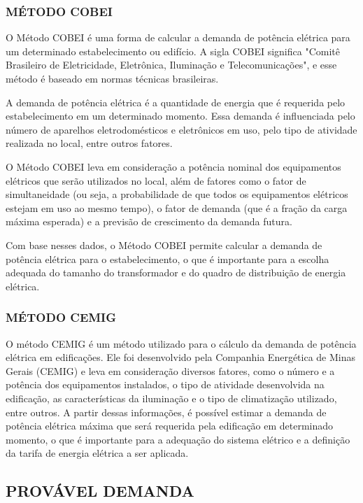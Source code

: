 \subsubsection{MÉTODO COBEI}
O Método COBEI é uma forma de calcular a demanda de potência elétrica para um determinado estabelecimento ou edifício. A sigla COBEI significa "Comitê Brasileiro de Eletricidade, Eletrônica, Iluminação e Telecomunicações", e esse método é baseado em normas técnicas brasileiras.

A demanda de potência elétrica é a quantidade de energia que é requerida pelo estabelecimento em um determinado momento. Essa demanda é influenciada pelo número de aparelhos eletrodomésticos e eletrônicos em uso, pelo tipo de atividade realizada no local, entre outros fatores.

O Método COBEI leva em consideração a potência nominal dos equipamentos elétricos que serão utilizados no local, além de fatores como o fator de simultaneidade (ou seja, a probabilidade de que todos os equipamentos elétricos estejam em uso ao mesmo tempo), o fator de demanda (que é a fração da carga máxima esperada) e a previsão de crescimento da demanda futura.

Com base nesses dados, o Método COBEI permite calcular a demanda de potência elétrica para o estabelecimento, o que é importante para a escolha adequada do tamanho do transformador e do quadro de distribuição de energia elétrica.

\subsubsection{MÉTODO CEMIG}

O método CEMIG é um método utilizado para o cálculo da demanda de potência elétrica em edificações. Ele foi desenvolvido pela Companhia Energética de Minas Gerais (CEMIG) e leva em consideração diversos fatores, como o número e a potência dos equipamentos instalados, o tipo de atividade desenvolvida na edificação, as características da iluminação e o tipo de climatização utilizado, entre outros. A partir dessas informações, é possível estimar a demanda de potência elétrica máxima que será requerida pela edificação em determinado momento, o que é importante para a adequação do sistema elétrico e a definição da tarifa de energia elétrica a ser aplicada.

\subsection{PROVÁVEL DEMANDA}

